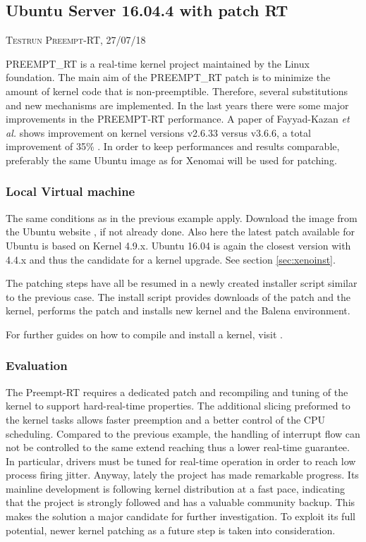 \documentclass[]{scrartcl}
\begin{document}
\subsection{Ubuntu Server 16.04.4 with patch RT}

{\small\textsc{Testrun Preempt-RT, 27/07/18} \bigskip}

PREEMPT\_RT is a real-time kernel project maintained by the Linux foundation. 
The main aim of the PREEMPT\_RT patch is to minimize the amount of kernel code that is non-preemptible. Therefore, several substitutions and new mechanisms are implemented.
In the last years there were some major improvements in the PREEMPT-RT performance. A paper of Fayyad-Kazan \textit{et al.} shows improvement on kernel versions v2.6.33 versus v3.6.6, a total improvement of 35\% \cite{Fayyad-Kazanetal2014}. In order to keep performances and results comparable, preferably the same Ubuntu image as for Xenomai will be used for patching.

\subsubsection{Local Virtual machine}

The same conditions as in the previous example apply. Download the image from the Ubuntu website \cite{ubuntu02}, if not already done. Also here the latest patch available for Ubuntu is based on Kernel 4.9.x. Ubuntu 16.04 is again the closest version with 4.4.x and thus the candidate for a kernel upgrade. See section \ref{sec:xenoinst}.

The patching steps have all be resumed in a newly created installer script similar to the previous case. The install script provides downloads of the patch and the kernel, performs the patch and installs new kernel and the Balena environment.

For further guides on how to compile and install a kernel, visit \cite{misc01}.

\subsubsection{Evaluation}

The Preempt-RT requires a dedicated patch and recompiling and tuning of the kernel to support hard-real-time properties. The additional slicing preformed to the kernel tasks allows faster preemption and a better control of the CPU scheduling.
Compared to the previous example, the handling of interrupt flow can not be controlled to the same extend reaching thus a lower real-time guarantee. In particular, drivers must be tuned for real-time operation in order to reach low process firing jitter.
Anyway, lately the project has made remarkable progress.
Its mainline development is following kernel distribution at a fast pace, indicating that the project is strongly followed and has a valuable community backup. This makes the solution a major candidate for further investigation.
To exploit its full potential, newer kernel patching as a future step is taken into consideration.
\end{document}
